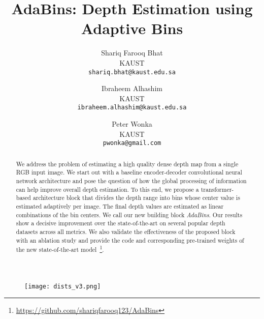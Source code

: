 \documentclass[final]{cvpr}
\begin{document}
\title{AdaBins: Depth Estimation using Adaptive Bins}

\author{Shariq Farooq Bhat \\
KAUST\\
{\tt\small shariq.bhat@kaust.edu.sa}

\and
Ibraheem Alhashim\\
KAUST\\
{\tt\small ibraheem.alhashim@kaust.edu.sa}

\and
Peter Wonka\\
KAUST\\
{\tt\small pwonka@gmail.com}
}

\maketitle


\begin{abstract}
We address the problem of estimating a high quality dense depth map from a single RGB input image. We start out with a baseline encoder-decoder convolutional neural network architecture and pose the question of how the global processing of information can help improve overall depth estimation. To this end, we propose a transformer-based architecture block that divides the depth range into bins whose center value is estimated adaptively per image. The final depth values are estimated as linear combinations of the bin centers. We call our new building block \emph{AdaBins}. Our results show a decisive improvement over the state-of-the-art on several popular depth datasets across all metrics. We also validate the effectiveness of the proposed block with an ablation study and provide the code and corresponding pre-trained weights of the new state-of-the-art model~\footnote{\url{https://github.com/shariqfarooq123/AdaBins}}.
\end{abstract}




\begin{figure}[t]
\centering
    \texttt{[image: dists\_v3.png]}
\end{figure}
\end{document}

